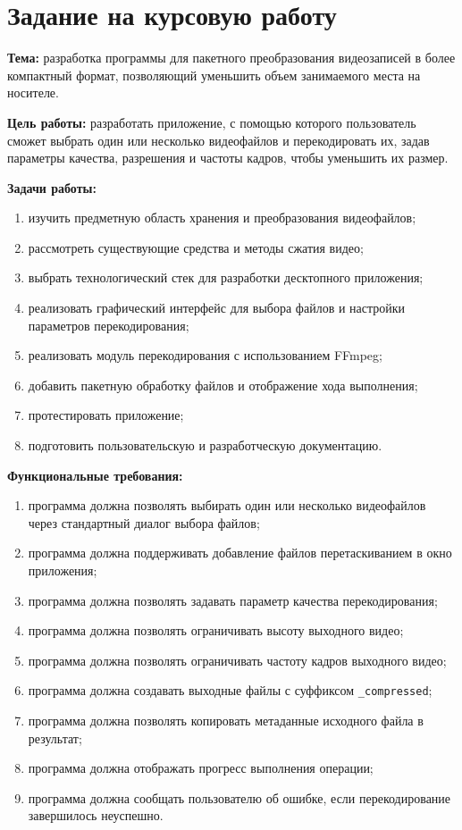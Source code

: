 \documentclass[14pt,a4paper]{extarticle}
\begin{document}
\section*{Задание на курсовую работу}

\textbf{Тема:} разработка программы для пакетного преобразования видеозаписей в более компактный формат, позволяющий уменьшить объем занимаемого места на носителе.

\textbf{Цель работы:} разработать приложение, с помощью которого пользователь сможет выбрать один или несколько видеофайлов и перекодировать их, задав параметры качества, разрешения и частоты кадров, чтобы уменьшить их размер.

\textbf{Задачи работы:}
\begin{enumerate}
	\item изучить предметную область хранения и преобразования видеофайлов;
	\item рассмотреть существующие средства и методы сжатия видео;
	\item выбрать технологический стек для разработки десктопного приложения;
	\item реализовать графический интерфейс для выбора файлов и настройки параметров перекодирования;
	\item реализовать модуль перекодирования с использованием FFmpeg;
	\item добавить пакетную обработку файлов и отображение хода выполнения;
	\item протестировать приложение;
	\item подготовить пользовательскую и разработческую документацию.
\end{enumerate}

\textbf{Функциональные требования:}
\begin{enumerate}
	\item программа должна позволять выбирать один или несколько видеофайлов через стандартный диалог выбора файлов;
	\item программа должна поддерживать добавление файлов перетаскиванием в окно приложения;
	\item программа должна позволять задавать параметр качества перекодирования;
	\item программа должна позволять ограничивать высоту выходного видео;
	\item программа должна позволять ограничивать частоту кадров выходного видео;
	\item программа должна создавать выходные файлы с суффиксом \texttt{\_compressed};
	\item программа должна позволять копировать метаданные исходного файла в результат;
	\item программа должна отображать прогресс выполнения операции;
	\item программа должна сообщать пользователю об ошибке, если перекодирование завершилось неуспешно.
\end{enumerate}
\end{document}
